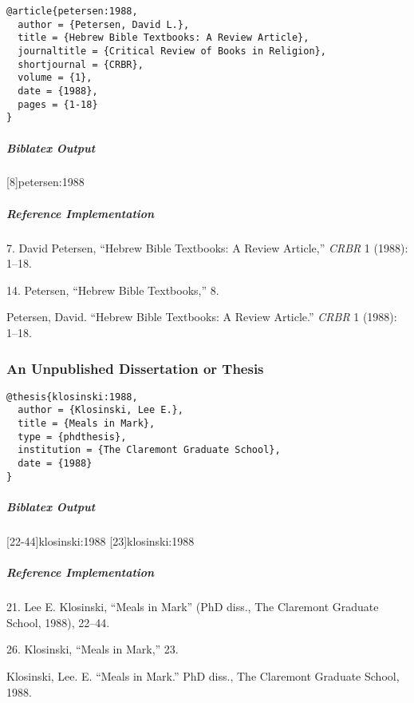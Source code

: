 \documentclass[a4paper]{article}
\newenvironment{biboutput}{%
  \subparagraph{Biblatex Output}
}{\color{black}}
\newenvironment{refimp}{%
  \subparagraph{Reference Implementation}
  \color{reference-colour}
  \rm
}{\par\color{black}}
\begin{document}
\begin{lstlisting}
@article{petersen:1988,
  author = {Petersen, David L.},
  title = {Hebrew Bible Textbooks: A Review Article},
  journaltitle = {Critical Review of Books in Religion},
  shortjournal = {CRBR},
  volume = {1},
  date = {1988},
  pages = {1-18}
}
\end{lstlisting}

\begin{biboutput}
  [8]{petersen:1988}
\end{biboutput}

\begin{refimp}
  \hspace*{\bibindent}7. David Petersen, “Hebrew Bible Textbooks: A Review
  Article,” \emph{CRBR} 1 (1988): 1–18.

  \hspace*{\bibindent}14. Petersen, “Hebrew Bible Textbooks,” 8.

  \hangindent\bibindent Petersen, David. “Hebrew Bible Textbooks: A Review
  Article.” \emph{CRBR} 1 (1988): 1–18.

\end{refimp}

\subsubsection{An Unpublished Dissertation or Thesis}

\begin{lstlisting}
@thesis{klosinski:1988,
  author = {Klosinski, Lee E.},
  title = {Meals in Mark},
  type = {phdthesis},
  institution = {The Claremont Graduate School},
  date = {1988}
}
\end{lstlisting}  

\begin{biboutput}
  [22-44]{klosinski:1988}
  [23]{klosinski:1988}
\end{biboutput}

\begin{refimp}
  \hspace*{\bibindent}21. Lee E. Klosinski, “Meals in Mark” (PhD diss., The
  Claremont Graduate School, 1988), 22–44.

  \hspace*{\bibindent}26. Klosinski, “Meals in Mark,” 23.

  \hangindent\bibindent Klosinski, Lee. E. “Meals in Mark.” PhD diss., The
  Claremont Graduate School, 1988.
\end{refimp}
\end{document}
